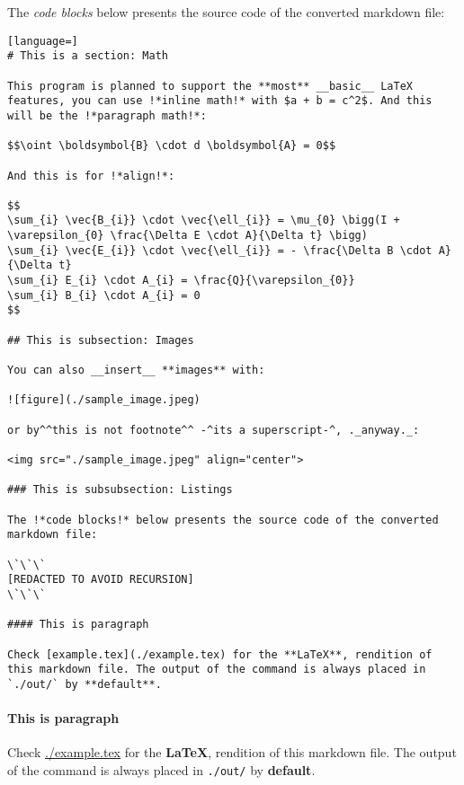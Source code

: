 \documentclass[12pt, UTF8]{article}
\begin{document}
	The \emph{code blocks} below presents the source code of the converted markdown file:
	
	
\begin{lstlisting}[language=]
# This is a section: Math

This program is planned to support the **most** __basic__ LaTeX features, you can use !*inline math!* with $a + b = c^2$. And this will be the !*paragraph math!*:

$$\oint \boldsymbol{B} \cdot d \boldsymbol{A} = 0$$

And this is for !*align!*:

$$
\sum_{i} \vec{B_{i}} \cdot \vec{\ell_{i}} = \mu_{0} \bigg(I + \varepsilon_{0} \frac{\Delta E \cdot A}{\Delta t} \bigg)
\sum_{i} \vec{E_{i}} \cdot \vec{\ell_{i}} = - \frac{\Delta B \cdot A}{\Delta t}
\sum_{i} E_{i} \cdot A_{i} = \frac{Q}{\varepsilon_{0}}
\sum_{i} B_{i} \cdot A_{i} = 0
$$

## This is subsection: Images

You can also __insert__ **images** with:

![figure](./sample_image.jpeg)

or by^^this is not footnote^^ -^its a superscript-^, ._anyway._:

<img src="./sample_image.jpeg" align="center">

### This is subsubsection: Listings

The !*code blocks!* below presents the source code of the converted markdown file:

\`\`\`
[REDACTED TO AVOID RECURSION]
\`\`\`

#### This is paragraph

Check [example.tex](./example.tex) for the **LaTeX**, rendition of this markdown file. The output of the command is always placed in `./out/` by **default**.

\end{lstlisting}
	
	\paragraph{This is paragraph}
	
	Check \href{example.tex}{./example.tex} for the \textbf{LaTeX}, rendition of this markdown file. The output of the command is always placed in \texttt{./out/} by \textbf{default}.
	
\end{document}
